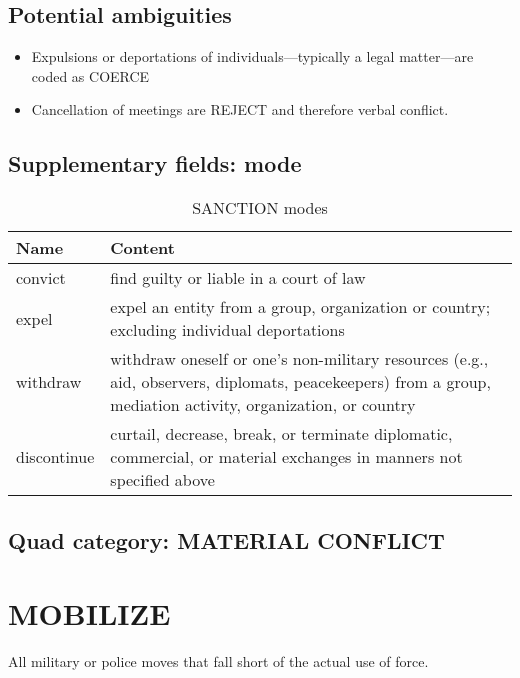 \documentclass[11pt]{report}
\newcommand{\plcat}[1]{\textsf{#1}}
\begin{document}
\subsection{Potential ambiguities}

\begin{itemize}
\item Expulsions or deportations of individuals---typically a legal matter---are coded as \plcat{COERCE} 
\item Cancellation of meetings are \plcat{REJECT} and therefore verbal conflict.
\end{itemize}

\subsection{Supplementary fields: mode}

\begin{table}[htp]
\caption{SANCTION modes}
\begin{center}
\begin{tabular}{|l|p{13cm}|}
\hline
Name & Content \\
\hline
convict & find guilty or liable in a court of law\\
expel & expel an entity from a group, organization or country; excluding individual deportations \\
withdraw & withdraw oneself or one's non-military resources (e.g., aid, observers, diplomats, peacekeepers) from a group, mediation activity, organization, or country\\
discontinue & curtail, decrease, break, or terminate diplomatic, commercial, or material exchanges in manners not specified above \\
\hline
\end{tabular}
\end{center}
\label{tab:sanctionmode}
\end{table}%

\subsection{Quad category: MATERIAL CONFLICT}

\newpage  

\section{MOBILIZE}

All military or police moves that fall short of the actual use of force. 
\end{document}
